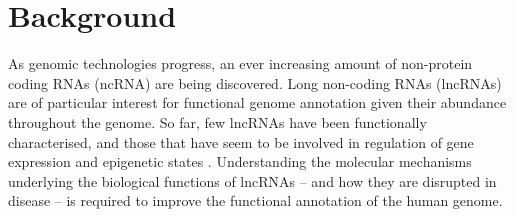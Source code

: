 \documentclass{bmcart}
\begin{document}
\begin{frontmatter}
\begin{abstractbox}
\begin{keyword}
\end{keyword}


\end{abstractbox}
%

\end{frontmatter}





\section*{Background}

As genomic technologies progress, an ever increasing amount of non-protein 
coding RNAs (ncRNA) are being discovered. 
Long non-coding RNAs (lncRNAs) are of particular interest for functional genome
annotation given their abundance throughout the genome. 
So far, few lncRNAs have been functionally characterised, 
and those that have seem to be involved in regulation of gene expression and epigenetic states 
\cite{morris2014rise,engreitz2016long}. 
Understanding the molecular mechanisms underlying the biological functions of lncRNAs 
-- and how they are disrupted in disease -- is required to improve the functional
annotation of the human genome. \\
\end{document}
